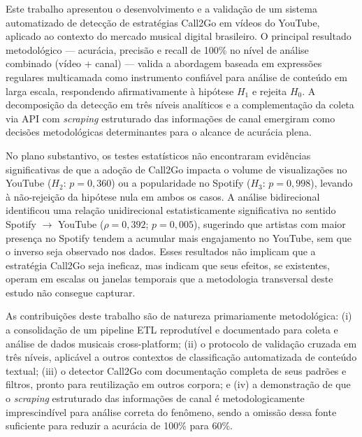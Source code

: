 \documentclass[12pt, a4paper]{article}
\begin{document}
Este trabalho apresentou o desenvolvimento e a validação de um sistema automatizado de detecção de estratégias Call2Go em vídeos do YouTube, aplicado ao contexto do mercado musical digital brasileiro. O principal resultado metodológico --- acurácia, precisão e recall de 100\% no nível de análise combinado (vídeo + canal) --- valida a abordagem baseada em expressões regulares multicamada como instrumento confiável para análise de conteúdo em larga escala, respondendo afirmativamente à hipótese $H_1$ e rejeita $H_0$. A decomposição da detecção em três níveis analíticos e a complementação da coleta via API com \textit{scraping} estruturado das informações de canal emergiram como decisões metodológicas determinantes para o alcance de acurácia plena.

No plano substantivo, os testes estatísticos não encontraram evidências significativas de que a adoção de Call2Go impacta o volume de visualizações no YouTube ($H_2$: $p = 0{,}360$) ou a popularidade no Spotify ($H_3$: $p = 0{,}998$), levando à não-rejeição da hipótese nula em ambos os casos. A análise bidirecional identificou uma relação unidirecional estatisticamente significativa no sentido Spotify $\to$ YouTube ($\rho = 0{,}392$; $p = 0{,}005$), sugerindo que artistas com maior presença no Spotify tendem a acumular mais engajamento no YouTube, sem que o inverso seja observado nos dados. Esses resultados não implicam que a estratégia Call2Go seja ineficaz, mas indicam que seus efeitos, se existentes, operam em escalas ou janelas temporais que a metodologia transversal deste estudo não consegue capturar.

As contribuições deste trabalho são de natureza primariamente metodológica: (i) a consolidação de um pipeline ETL reprodutível e documentado para coleta e análise de dados musicais cross-platform; (ii) o protocolo de validação cruzada em três níveis, aplicável a outros contextos de classificação automatizada de conteúdo textual; (iii) o detector Call2Go com documentação completa de seus padrões e filtros, pronto para reutilização em outros corpora; e (iv) a demonstração de que o \textit{scraping} estruturado das informações de canal é metodologicamente imprescindível para análise correta do fenômeno, sendo a omissão dessa fonte suficiente para reduzir a acurácia de 100\% para 60\%.
\end{document}
